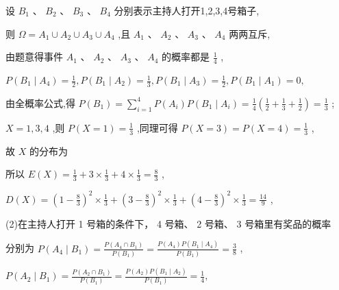 \documentclass[10pt]{article}
\begin{document}
设 \({B}_{1}\text{ 、 }{B}_{2}\text{ 、 }{B}_{3}\text{ 、 }{B}_{4}\) 分别表示主持人打开1,2,3,4号箱子,

则 \(\Omega  = {A}_{1} \cup  {A}_{2} \cup  {A}_{3} \cup  {A}_{4}\) ,且 \({A}_{1}\text{ 、 }{A}_{2}\text{ 、 }{A}_{3}\text{ 、 }{A}_{4}\) 两两互斥,

由题意得事件 \({A}_{1}\text{ 、 }{A}_{2}\text{ 、 }{A}_{3}\text{ 、 }{A}_{4}\) 的概率都是 \(\frac{1}{4}\) ,

\(P\left( {{B}_{1} \mid  {A}_{4}}\right)  = \frac{1}{2},P\left( {{B}_{1} \mid  {A}_{2}}\right)  = \frac{1}{3},P\left( {{B}_{1} \mid  {A}_{3}}\right)  = \frac{1}{2},P\left( {{B}_{1} \mid  {A}_{1}}\right)  = 0,\)

由全概率公式,得 \(P\left( {B}_{1}\right)  = \mathop{\sum }\limits_{{i = 1}}^{4}P\left( {A}_{i}\right) P\left( {{B}_{1} \mid  {A}_{i}}\right)  = \frac{1}{4}\left( {\frac{1}{2} + \frac{1}{3} + \frac{1}{2}}\right)  = \frac{1}{3}\) ;

\(X = 1,3,4\) ,则 \(P\left( {X = 1}\right)  = \frac{1}{3}\) ,同理可得 \(P\left( {X = 3}\right)  = P\left( {X = 4}\right)  = \frac{1}{3}\) ,

故 \(X\) 的分布为

\begin{center}
\end{center}

所以 \(E\left( X\right)  = \frac{1}{3} + 3 \times  \frac{1}{3} + 4 \times  \frac{1}{3} = \frac{8}{3}\) ,

\(D\left( X\right)  = {\left( 1 - \frac{8}{3}\right) }^{2} \times  \frac{1}{3} + {\left( 3 - \frac{8}{3}\right) }^{2} \times  \frac{1}{3} + {\left( 4 - \frac{8}{3}\right) }^{2} \times  \frac{1}{3} = \frac{14}{9}\) ,

(2)在主持人打开 1 号箱的条件下， 4 号箱、 2 号箱、 3 号箱里有奖品的概率

分别为 \(P\left( {{A}_{4} \mid  {B}_{1}}\right)  = \frac{P\left( {{A}_{4} \cap  {B}_{1}}\right) }{P\left( {B}_{1}\right) } = \frac{P\left( {A}_{4}\right) P\left( {{B}_{1} \mid  {A}_{4}}\right) }{P\left( {B}_{1}\right) } = \frac{3}{8}\) ,

\(P\left( {{A}_{2} \mid  {B}_{1}}\right)  = \frac{P\left( {{A}_{2} \cap  {B}_{1}}\right) }{P\left( {B}_{1}\right) } = \frac{P\left( {A}_{2}\right) P\left( {{B}_{1} \mid  {A}_{2}}\right) }{P\left( {B}_{1}\right) } = \frac{1}{4},\)
\end{document}
